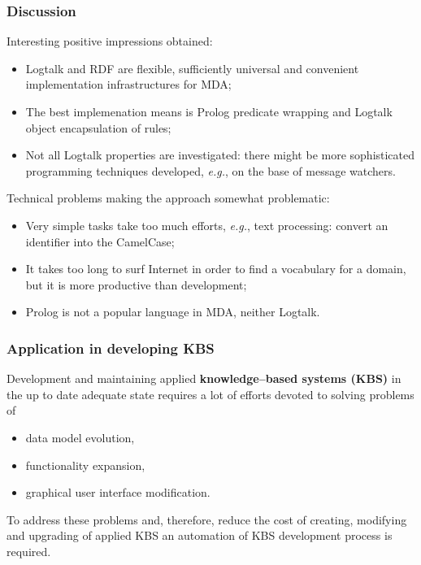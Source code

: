 \documentclass[10pt]{beamer}
\begin{document}
\begin{frame}
  \frametitle{Discussion}
  Interesting positive impressions obtained:
  \begin{itemize}
  \item Logtalk and RDF are flexible, sufficiently universal and convenient implementation infrastructures for MDA;
  \item The best implemenation means is Prolog predicate wrapping and Logtalk object encapsulation of rules;
  \item Not all Logtalk properties are investigated: there might be more sophisticated programming techniques developed, \emph{e.g.}, on the base of message watchers.
  \end{itemize}
  Technical problems making the approach somewhat problematic:
  \begin{itemize}
  \item Very simple tasks take too much efforts, \emph{e.g.}, text processing: convert an identifier into the CamelCase;
  \item It takes too long to surf Internet in order to find a vocabulary for a domain, but it is more productive than development;
  \item Prolog is not a popular language in MDA, neither Logtalk.
  \end{itemize}
\end{frame}

\begin{frame}
  \frametitle{Application in developing KBS}
  Development and maintaining applied \textbf{knowledge--based systems (KBS)} in the up to date adequate state requires a lot of efforts devoted to solving problems of
  \begin{itemize}
  \item data model evolution,
  \item functionality expansion,
  \item graphical user interface modification.
\end{itemize}

To address these problems and, therefore, reduce the cost of creating, modifying and upgrading of applied KBS an automation of KBS development process is required.
\end{frame}
\end{document}
